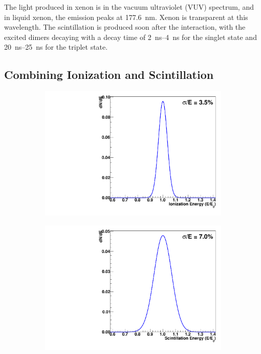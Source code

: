 \documentclass[herrin-thesis.tex]{subfiles}
\begin{document}
The light produced in xenon is in the vacuum ultraviolet (VUV) spectrum, and in liquid xenon, the emission peaks at \SI{177.6}{\nm}. Xenon is transparent at this wavelength. The scintillation is produced soon after the interaction, with the excited dimers decaying with a decay time of \SIrange{2}{4}{\ns} for the singlet state and \SIrange{20}{25}{\ns} for the triplet state\cite{Aprile:2010uq}.

\subsection{Combining Ionization and Scintillation}
\label{sec:xe_combining_ion_and_scint}

\begin{figure}[htp]
\centering
\begin{subfigure}[c]{0.45\linewidth}
\includegraphics[width=\textwidth]{./plots/xe_anticorrelation_ioniz.pdf}
\end{subfigure}\hspace{0.05\linewidth}\hfill%
\begin{subfigure}[c]{0.45\linewidth}
\includegraphics[width=\textwidth]{./plots/xe_anticorrelation_scint.pdf}

\end{subfigure}
\end{figure}
\end{document}
